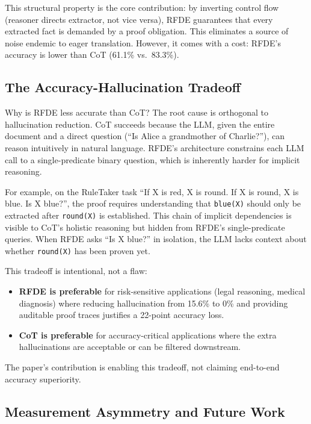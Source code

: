 \documentclass[11pt,letterpaper]{article}
\begin{document}
This structural property is the core contribution: by inverting control flow (reasoner directs
extractor, not vice versa), RFDE guarantees that every extracted fact is demanded by a proof
obligation. This eliminates a source of noise endemic to eager translation. However, it comes
with a cost: RFDE's accuracy is lower than CoT (61.1\% vs.\ 83.3\%).

\subsection{The Accuracy-Hallucination Tradeoff}

Why is RFDE less accurate than CoT? The root cause is orthogonal to hallucination reduction.
CoT succeeds because the LLM, given the entire document and a direct question (``Is Alice a
grandmother of Charlie?''), can reason intuitively in natural language. RFDE's architecture
constrains each LLM call to a single-predicate binary question, which is inherently harder for
implicit reasoning.

For example, on the RuleTaker task ``If X is red, X is round. If X is round, X is blue. Is X
blue?'', the proof requires understanding that \texttt{blue(X)} should only be extracted after
\texttt{round(X)} is established. This chain of implicit dependencies is visible to CoT's
holistic reasoning but hidden from RFDE's single-predicate queries. When RFDE asks ``Is X
blue?'' in isolation, the LLM lacks context about whether \texttt{round(X)} has been proven
yet.

This tradeoff is intentional, not a flaw:
\begin{itemize}
  \item \textbf{RFDE is preferable} for risk-sensitive applications (legal reasoning, medical
    diagnosis) where reducing hallucination from 15.6\% to 0\% and providing auditable proof
    traces justifies a 22-point accuracy loss.
  \item \textbf{CoT is preferable} for accuracy-critical applications where the extra
    hallucinations are acceptable or can be filtered downstream.
\end{itemize}

The paper's contribution is enabling this tradeoff, not claiming end-to-end accuracy
superiority.

\subsection{Measurement Asymmetry and Future Work}
\end{document}
